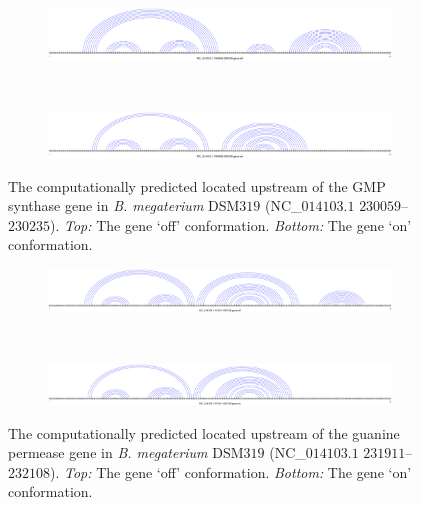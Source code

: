 \begin{figure}[!ht]
\centering
\begin{subfigure}[h]{\textwidth}
\centering
\includegraphics[width=.9\textwidth]{Figures/Ribofinder/NC_014103_1_230059_230235_OFF.pdf}
\end{subfigure} \\
\medskip
\begin{subfigure}[h]{\textwidth}
\centering
\includegraphics[width=.9\textwidth]{Figures/Ribofinder/NC_014103_1_230059_230235_ON.pdf}
\end{subfigure}
\caption[Structures for the putative \rb located upstream of the GMP synthase gene in {\em B. megaterium} DSM$319$]{The computationally predicted \rb located upstream of the GMP synthase
gene in {\em B. megaterium} DSM$319$ (NC\_$014103.1$ $230059$--$230235$).
{\em Top:} The gene `off' conformation. {\em Bottom:} The gene `on' conformation.}
\label{fig:figure:NC_014103_1_230059_230235}
\end{figure}
\medskip

\begin{figure}[!ht]
\centering
\begin{subfigure}[h]{\textwidth}
\centering
\includegraphics[width=.9\textwidth]{Figures/Ribofinder/NC_014103_1_231911_232108_OFF.pdf}
\end{subfigure} \\
\medskip
\begin{subfigure}[h]{\textwidth}
\centering
\includegraphics[width=.9\textwidth]{Figures/Ribofinder/NC_014103_1_231911_232108_ON.pdf}
\end{subfigure}
\caption[Structures for the putative \rb located upstream of the guanine permease gene in {\em B. megaterium} DSM$319$]{The computationally predicted \rb located upstream of the guanine permease
gene in {\em B. megaterium} DSM$319$ (NC\_$014103.1$ $231911$--$232108$).
{\em Top:} The gene `off' conformation. {\em Bottom:} The gene `on' conformation.}
\label{fig:figure:NC_014103_1_231911_232108}
\end{figure}
\medskip

